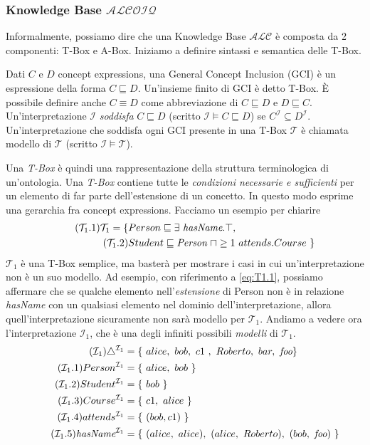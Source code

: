 \subsubsection*{Knowledge Base $\mathcal{ALCOIQ}$}
Informalmente, possiamo dire che una Knowledge Base $\mathcal{ALC}$ è composta da 2 componenti: T-Box e A-Box. Iniziamo a definire sintassi e semantica delle T-Box.
\begin{definition}
	Dati $C$ e $D$ concept expressions, una General Concept Inclusion (GCI) è un espressione della forma $C \sqsubseteq D$. Un'insieme finito di GCI è detto T-Box. È possibile definire anche $C \equiv D$ come abbreviazione di $C \sqsubseteq D$ e $D \sqsubseteq C$.\\
	Un'interpretazione $\mathcal{I}$ \textit{soddisfa} $C \sqsubseteq D$ (scritto $\mathcal{I} \models C \sqsubseteq D $) se $C^\mathcal{I} \subseteq D^\mathcal{I}$. Un'interpretazione che soddisfa ogni GCI presente in una T-Box $\mathcal{T}$ è chiamata modello di $\mathcal{T}$ (scritto $\mathcal{I} \models \mathcal{T}$).
\end{definition}
\noindent
Una \textit{T-Box} è quindi una rappresentazione della struttura terminologica di un’ontologia. Una \textit{T-Box} contiene tutte le \textit{condizioni necessarie e sufficienti} per un elemento di far parte dell'estensione di un concetto. In questo modo esprime una gerarchia fra concept expressions. Facciamo un esempio per chiarire
\begin{align}
	\tag{$\mathcal{T}_1$.1} \label{eq:T1.1}
	\mathcal{T}_1 = \{&Person \sqsubseteq \exists\ \textit{hasName}.\top,\\
	\tag{$\mathcal{T}_1$.2} \label{eq:T1.2}
	&Student \sqsubseteq \textit{Person}\ \sqcap \ge 1\ attends.Course\ \}
\end{align}
$\mathcal{T}_1$ è una T-Box semplice, ma basterà per mostrare i casi in cui un'interpretazione non è un suo modello. Ad esempio, con riferimento a \eqref{eq:T1.1}, possiamo affermare che se qualche elemento nell'\textit{estensione} di Person non è in relazione \textit{hasName} con un qualsiasi elemento nel dominio dell'interpretazione, allora quell'interpretazione sicuramente non sarà modello per $\mathcal{T}_1$. Andiamo a vedere ora l'interpretazione $\mathcal{I}_1$, che è una degli infiniti possibili \textit{modelli} di $\mathcal{T}_1$.
\begin{align}
	\tag{$\mathcal{I}_1$} \label{eq:I1}
	\triangle^{\mathcal{I}_1} &= \{\ alice,\ bob,\ c1\ ,\ Roberto,\ bar,\ \textit{foo}\}\\
	\tag{$\mathcal{I}_1$.1} \label{eq:I1.1}
	Person^{\mathcal{I}_1} &= \{\ alice,\ bob\ \}\\
	\tag{$\mathcal{I}_1$.2} \label{eq:I1.2}
	Student^{\mathcal{I}_1} &= \{\ bob\ \} \\
	\tag{$\mathcal{I}_1$.3} \label{eq:I1.3}
	Course^{\mathcal{I}_1} &= \{\ c1,\ alice\ \}\\
	\tag{$\mathcal{I}_1$.4} \label{eq:I1.4}
	attends^{\mathcal{I}_1} &= \{\ (bob, c1)\ \}\\
	\tag{$\mathcal{I}_1$.5} \label{eq:I1.5}
	\textit{hasName}^{\mathcal{I}_1} &= \{\ (alice,\ alice),\ (alice,\ Roberto),\ (bob,\ \textit{foo})\ \}
\end{align}
